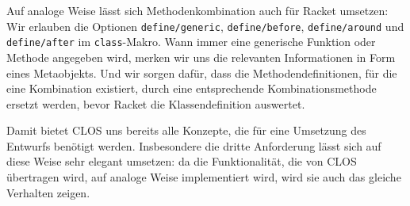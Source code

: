 Auf analoge Weise lässt sich Methodenkombination auch für Racket umsetzen: 
Wir erlauben die Optionen \texttt{define/generic}, \texttt{define/before}, \texttt{define/around} und \texttt{define/after} im \texttt{class}-Makro. Wann immer eine generische Funktion oder Methode angegeben wird, merken wir uns die relevanten Informationen in Form eines Metaobjekts. Und wir sorgen dafür, dass die Methodendefinitionen, für die eine Kombination existiert, durch eine entsprechende Kombinationsmethode ersetzt werden, bevor Racket die Klassendefinition auswertet.

Damit bietet CLOS uns bereits alle Konzepte, die für eine Umsetzung des Entwurfs benötigt werden. Insbesondere die dritte Anforderung lässt sich auf diese Weise sehr elegant umsetzen: da die Funktionalität, die von CLOS übertragen wird, auf analoge Weise implementiert wird, wird sie auch das gleiche Verhalten zeigen.